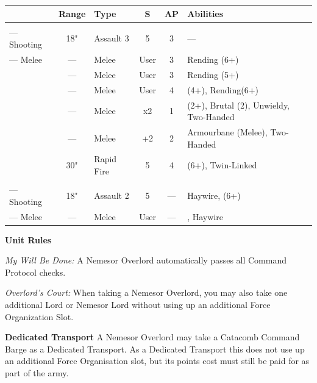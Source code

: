 \begin{minipage}[t]{0.72\textwidth}
	\begin{tabular}{L{90 pt} c C{40pt} *{2}{c} >{\raggedright\arraybackslash}p{130pt}}
		& Range & Type & S & AP & Abilities \\
		\hline
		 & & &  &  &  \\
		— Shooting & 18" & Assault 3 & 5 & 3 & — \\
		— Melee & — & Melee & User & 3 & Rending (6+) \\
		 & — & Melee & User & 3 & Rending (5+) \\
		 & — & Melee & User & 4 &  (4+), Rending(6+) \\
		 & — & Melee & x2 & 1 &  (2+), Brutal (2), Unwieldy, Two-Handed \\
		 & — & Melee & +2 & 2 & Armourbane (Melee), Two-Handed \\
		 & 30" & Rapid Fire & 5 & 4 &  (6+), Twin-Linked \\	
		 & & &  &  &  \\
		— Shooting & 18" & Assault 2 & 5 & — & Haywire,  (6+) \\
		— Melee & — & Melee & User & — & , Haywire \\
	\end{tabular}
	
	\vspace*{2em}
	\textbf{Unit Rules}
	
	\textit{My Will Be Done:} A Nemesor Overlord automatically passes all Command Protocol checks.
	
	\textit{Overlord's Court:} When taking a Nemesor Overlord, you may also take one additional Lord or Nemesor Lord without using up an additional Force Organization Slot. 
	
	\vspace*{2em}
	\textbf{Dedicated Transport}
	A Nemesor Overlord may take a Catacomb Command Barge as a Dedicated Transport. As a Dedicated Transport this does not use up an additional Force Organisation slot, but its points cost must still be paid for as part of the army.
	

\end{minipage}
